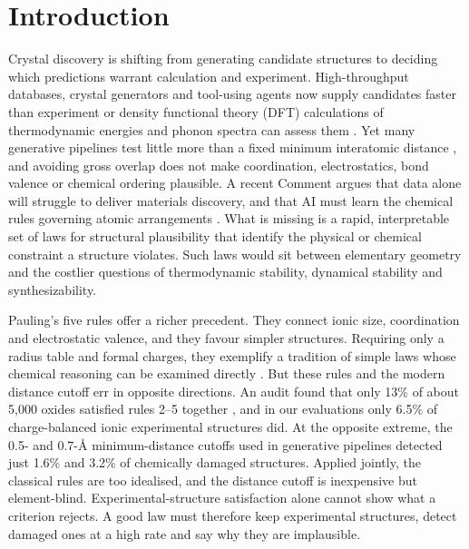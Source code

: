 \section{Introduction}

Crystal discovery is shifting from generating candidate structures to deciding which
predictions warrant calculation and experiment. High-throughput databases, crystal
generators and tool-using agents
\cite{jain2013commentary,merchant2023scaling,xie2022crystal,jiao2023crystal,sriram2024flowllm,antunes2024crystal,boiko2023autonomous,mbran2024augmenting}
now supply candidates faster than experiment or density functional theory (DFT)
calculations of thermodynamic energies and phonon spectra can assess them
\cite{bartel2019new,petretto2018highthroughput,zhu2024highthroughput,szymanski2023autonomous}.
Yet many generative pipelines test little more than a fixed
minimum interatomic distance
\cite{court20203d,xie2022crystal,jiao2023crystal,miller2024flowmm,betala2025lematgenbench},
and avoiding gross overlap does not make coordination, electrostatics,
bond valence or chemical ordering plausible. A recent Comment argues that data alone will struggle to deliver materials discovery, and that AI
must learn the chemical rules governing atomic arrangements \cite{smit2026dataonly}. What
is missing is a rapid, interpretable set of laws for structural plausibility that identify
the physical or chemical constraint a structure violates. Such laws would sit between elementary geometry and the
costlier questions of thermodynamic stability, dynamical stability and synthesizability.

Pauling's five rules offer a richer precedent. They connect ionic size, coordination
and electrostatic valence, and they favour simpler structures. Requiring only a radius
table and formal charges, they exemplify a tradition of simple laws whose chemical
reasoning can be examined directly
\cite{pauling1929principles,goldschmidt1926gesetze,pettifor1984chemical,zunger1980systematization,hawthorne2014structure}.
But these rules and the modern distance cutoff err in opposite directions. An audit found
that only 13\% of about 5{,}000 oxides satisfied rules 2--5 together
\cite{george2020limited}, and in our evaluations only 6.5\% of charge-balanced ionic
experimental structures did. At the opposite extreme, the 0.5- and 0.7-\AA{}
minimum-distance cutoffs used in generative pipelines detected just 1.6\% and 3.2\% of
chemically damaged structures. Applied jointly, the classical
rules are too idealised, and the distance cutoff is inexpensive but element-blind.
Experimental-structure satisfaction alone cannot show what a criterion rejects. A good law
must therefore keep experimental
structures, detect damaged ones at a high rate and say why they are implausible.

